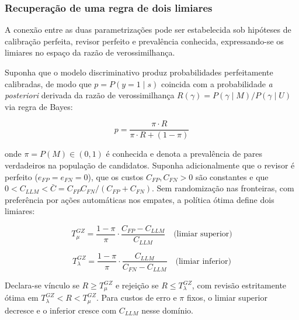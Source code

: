 \subsubsection{Recuperação de uma regra de dois limiares}

A conexão entre as duas parametrizações pode ser estabelecida sob hipóteses de calibração perfeita, revisor perfeito e prevalência conhecida, expressando-se os limiares no espaço da razão de verossimilhança.

\begin{proposition}
\label{prop:threshold-recovery}
Suponha que o modelo discriminativo produz probabilidades perfeitamente calibradas, de modo que $p = P(y=1\mid s)$ coincida com a probabilidade \textit{a posteriori} derivada da razão de verossimilhança $R(\gamma) = P(\gamma\mid M)/P(\gamma\mid U)$ via regra de Bayes:

\[
p = \frac{\pi \cdot R}{\pi \cdot R + (1 - \pi)}
\]

onde $\pi = P(M)\in(0,1)$ é conhecida e denota a prevalência de pares verdadeiros na população de candidatos. Suponha adicionalmente que o revisor é perfeito ($e_{FP} = e_{FN} = 0$), que os custos $C_{FP},C_{FN}>0$ são constantes e que $0<C_{LLM}<\bar C=C_{FP}C_{FN}/(C_{FP}+C_{FN})$. Sem randomização nas fronteiras, com preferência por ações automáticas nos empates, a política ótima define dois limiares:

\[
T_\mu^{GZ} = \frac{1-\pi}{\pi} \cdot \frac{C_{FP} - C_{LLM}}{C_{LLM}} \quad \text{(limiar superior)}
\]

\[
T_\lambda^{GZ} = \frac{1-\pi}{\pi} \cdot \frac{C_{LLM}}{C_{FN} - C_{LLM}} \quad \text{(limiar inferior)}
\]

Declara-se vínculo se $R\ge T_\mu^{GZ}$ e rejeição se $R\le T_\lambda^{GZ}$, com revisão estritamente ótima em $T_\lambda^{GZ}<R<T_\mu^{GZ}$. Para custos de erro e $\pi$ fixos, o limiar superior decresce e o inferior cresce com $C_{LLM}$ nesse domínio.
\end{proposition}

